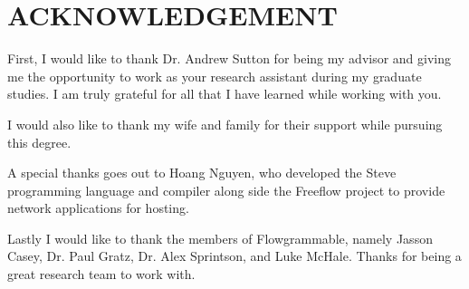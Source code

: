 \chapter*{ACKNOWLEDGEMENT}

First, I would like to thank Dr. Andrew Sutton for being my advisor and giving
me the opportunity to work as your research assistant during my graduate studies.
I am truly grateful for all that I have learned while working with you.

I would also like to thank my wife and family for their support while pursuing
this degree.

A special thanks goes out to Hoang Nguyen, who developed the Steve programming
language and compiler along side the Freeflow project to provide network applications for hosting.

Lastly I would like to thank the members of Flowgrammable, namely Jasson Casey, Dr.
Paul Gratz, Dr. Alex Sprintson, and Luke McHale. Thanks for being a great research
team to work with.
